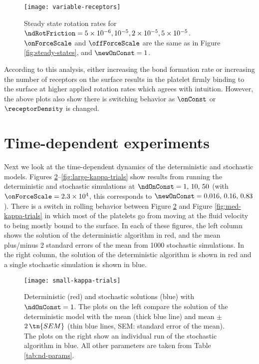 \begin{figure}
  \centering
  \texttt{[image: variable-receptors]}
  \caption[Steady state rotation rates for 4 different
  $\ndRotFriction$ values.]{Steady state rotation rates for
    $\ndRotFriction = 5 \times 10^{-6}, 10^{-5}, 2 \times 10^{-5}, 5
    \times 10^{-5}$. $\onForceScale$ and $\offForceScale$ are the same
    as in Figure \ref{fig:steady-states}, and $\newOnConst = 1$.}
  \label{fig:variable-receptors}
\end{figure}

According to this analysis, either increasing the bond formation rate
or increasing the number of receptors on the surface results in the
platelet firmly binding to the surface at higher applied rotation
rates which agrees with intuition. However, the above plots also show
there is switching behavior as $\onConst$ or $\receptorDensity$ is
changed.

\section{Time-dependent experiments}
\label{sec:time-dep-exp}

Next we look at the time-dependent dynamics of the deterministic and
stochastic models. Figures
\ref{fig:small-kappa-trials}--\ref{fig:large-kappa-trials} show
results from running the deterministic and stochastic simulations at
$\ndOnConst = 1, \, 10, \, 50$ (with
$\onForceScale = 2.3 \times 10^4$, this corresponds to
$\newOnConst = 0.016, \, 0.16, \, 0.83$). There is a switch in rolling
behavior between Figure \ref{fig:small-kappa-trials} and Figure
\ref{fig:med-kappa-trials} in which most of the platelets go from
moving at the fluid velocity to being mostly bound to the surface. In
each of these figures, the left column shows the solution of the
deterministic algorithm in red, and the mean plus/minus 2 standard
errors of the mean from 1000 stochastic simulations. In the right
column, the solution of the deterministic algorithm is shown in red
and a single stochastic simulation is shown in blue.

\begin{figure}
  \centering
  \texttt{[image: small-kappa-trials]}
  \caption[Deterministic and stochastic solutions with
  $\ndOnConst = 1$.]{Deterministic (red) and stochastic solutions
    (blue) with $\ndOnConst = 1$. The plots on the left compare the
    solution of the deterministic model with the mean (thick blue
    line) and mean $\pm$ $2\,\tn{SEM}$ (thin blue lines, SEM: standard
    error of the mean). The plots on the right show an individual run
    of the stochastic algorithm in blue. All other parameters are
    taken from Table \ref{tab:nd-params}.}
  \label{fig:small-kappa-trials}
\end{figure}


